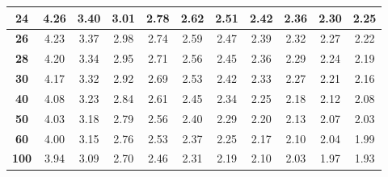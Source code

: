 \begin{tabular}{*{11}{|c}|}
\hline 
\textbf{24} & 4.26 &3.40 &3.01 &2.78 &2.62 &2.51 &2.42 &2.36 &2.30 &2.25 \\
\hline 
\textbf{26} & 4.23 &3.37 &2.98 &2.74 &2.59 &2.47 &2.39 &2.32 &2.27 &2.22 \\
\hline 
\textbf{28} & 4.20 &3.34 &2.95 &2.71 &2.56 &2.45 &2.36 &2.29 &2.24 &2.19 \\
\hline 
\textbf{30} & 4.17 &3.32 &2.92 &2.69 &2.53 &2.42 &2.33 &2.27 &2.21 &2.16 \\
\hline 
\textbf{40} & 4.08 &3.23 &2.84 &2.61 &2.45 &2.34 &2.25 &2.18 &2.12 &2.08 \\
\hline 
\textbf{50} & 4.03 &3.18 &2.79 &2.56 &2.40 &2.29 &2.20 &2.13 &2.07 &2.03 \\
\hline 
\textbf{60} & 4.00 &3.15 &2.76 &2.53 &2.37 &2.25 &2.17 &2.10 &2.04 &1.99 \\
\hline 
\textbf{100} & 3.94 &3.09 &2.70 &2.46 &2.31 &2.19 &2.10 &2.03 &1.97 &1.93 \\
\hline 
\end{tabular}